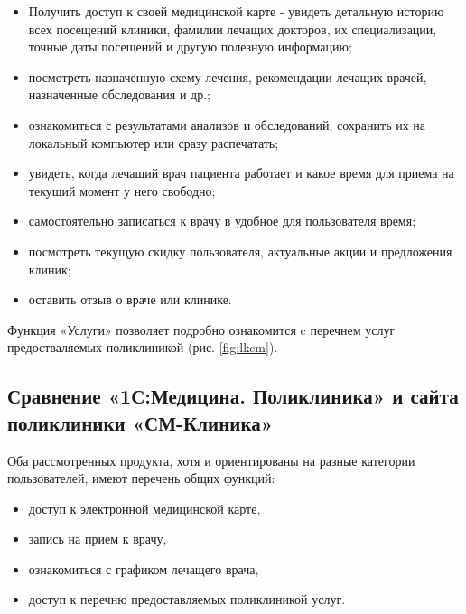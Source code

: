 \documentclass[14pt,a4paper,russian]{extreport}
\begin{document}
\begin{itemize}[noitemsep]
\renewcommand\labelitemi{--}
    \item Получить доступ к своей медицинской карте - увидеть детальную историю всех посещений
        клиники, фамилии лечащих докторов, их специализации, точные даты посещений и другую
        полезную информацию;

    \item посмотреть назначенную схему лечения, рекомендации лечащих врачей, назначенные
        обследования и др.;

    \item ознакомиться с результатами анализов и обследований, сохранить их на локальный компьютер или
        сразу распечатать;

    \item увидеть, когда лечащий врач пациента работает и какое время для приема на текущий момент у него
        свободно;

    \item самостоятельно записаться к врачу в удобное для пользователя время;

    \item посмотреть текущую скидку пользователя, актуальные акции и предложения клиник;

    \item оставить отзыв о враче или клинике.\cite{smclin}

\end{itemize}
Функция «Услуги» позволяет подробно ознакомится c перечнем услуг предостваляемых поликлиникой
(рис. \ref{fig:lkcm}).


\subsection{Сравнение «1С:Медицина. Поликлиника» и сайта поликлиники «СМ-Клиника»}
Оба рассмотренных продукта, хотя и ориентированы на разные категории пользователей, имеют перечень
общих функций:
\begin{itemize}[noitemsep]
\renewcommand\labelitemi{--}
    \item доступ к электронной медицинской карте,
    \item запись на прием к врачу,
    \item ознакомиться с графиком лечащего врача,
    \item доступ к перечню предоставляемых поликлиникой услуг.
\end{itemize}
\end{document}
